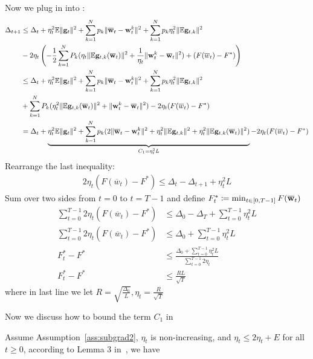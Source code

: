 Now we plug in \eq{\ref{eq:a24}} into \eq{\ref{eq:main2}}:
\begin{align}
	\Delta_{t+1} & \leq \Delta_t + 
	\eta_{t}^{2} \mathbb{E}\| {\mathbf{g}}_{t} \|^{2} + \sum_{k=1}^N p_k \|\overline{{\mathbf{w}}}_t - {\mathbf{w}}_t^k\|^2 +  \sum_{k=1}^N p_k \eta_t^2 \|\mathbb{E} {\mathbf{g}}_{t,k}\|^2 \\
	 &- 2 \eta_t \left(-\frac{1}{2} \sum_{k=1}^{N} P_{k} (\eta_t \|\mathbb{E} {\mathbf{g}}_{t,k}(\overline{{\mathbf{w}}}_t) \|^2 + \frac{1}{\eta_t} \|{\mathbf{w}}_t^k - \overline{{\mathbf{w}}}_t\|^2) + (F(\overline{w}_t) - F^*) \right)\\
	& \leq \Delta_t + 
	\eta_{t}^{2} \mathbb{E}\| {\mathbf{g}}_{t} \|^{2} + \sum_{k=1}^N p_k \|\overline{{\mathbf{w}}}_t - {\mathbf{w}}_t^k\|^2 +  \sum_{k=1}^N p_k \eta_t^2 \|\mathbb{E} {\mathbf{g}}_{t,k}\|^2 \\
	& +\sum_{k=1}^{N} P_{k} (\eta_t^2 \|\mathbb{E} {\mathbf{g}}_{t,k}(\overline{{\mathbf{w}}}_t) \|^2 + \|{\mathbf{w}}_t^k - \overline{{\mathbf{w}}}_t\|^2) - 2\eta_t (F(\overline{w}_t) - F^*)\\
	& = \Delta_t + \underbrace{\eta_{t}^{2} \mathbb{E}\| {\mathbf{g}}_{t} \|^{2} +\sum_{k=1}^N p_k  ( 2\|\overline{{\mathbf{w}}}_t - {\mathbf{w}}_t^k\|^2  +  \eta_t^2 \|\mathbb{E} {\mathbf{g}}_{t,k}\|^2 + \eta_t^2 \|\mathbb{E} {\mathbf{g}}_{t,k}(\overline{{\mathbf{w}}}_t) \|^2 )}_{C_1 = \eta_t^2L}  - 2\eta_t (F(\overline{w}_t) - F^*) \label{eq:main3}
\end{align}
Rearrange the last inequality:
\begin{align}
	2\eta_t (F(\overline{w}_t) - F^*) \leq \Delta_t - \Delta_{t+1} + \eta_t^2 L
\end{align}
Sum over two sides from $t=0$ to $t = T- 1$ and define $F^*_t \coloneqq \min_{t \in [0, T-1]} F(\overline{{\mathbf{w}}}_t)$
\begin{align}
	\sum_{t=0}^{T-1} 2\eta_t(F(\overline{w}_t) - F^*) & \leq \Delta_0 - \Delta_T + \sum_{t=0}^{T-1} \eta_t^2 L\\
	\sum_{t=0}^{T-1} 2\eta_t(F(\overline{w}_t) - F^*) & \leq \Delta_0 + \sum_{t=0}^{T-1} \eta_t^2 L\\
    F^*_t - F^* &\leq \frac{\Delta_0 + \sum_{t=0}^{T-1} \eta_t^2L}{ \sum_{t=0}^{T-1}  2 \eta_t}\\
    F^*_t - F^* &\leq \frac{RL}{\sqrt{T}}
\end{align}
where in last line we let $R = \sqrt{ \frac{\Delta_0}{L}}, \eta_t = \frac{R}{\sqrt{T}}$

Now we discuss how to bound the term $C_1$ in \eq{\ref{eq:main3}}

Assume Assumption~\ref{ass:subgrad2}, $\eta_t$ is non-increasing, and $\eta_t \leq 2\eta_t+E$ for all $t\geq 0$, according to Lemma 3 in~\cite{li2019convergence}, we have


